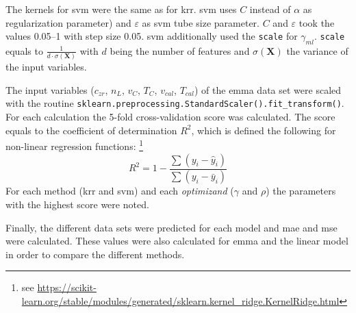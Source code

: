 The kernels for \gls{svm} were the same as for \gls{krr}. 
\Gls{svm} uses $C$ instead of $\alpha$ as regularization parameter) and  $\varepsilon$ as \gls{svm} tube size parameter.
$C$ and $\varepsilon$ took the values 0.05--1 with step size 0.05. 
\Gls{svm} additionally used the \texttt{scale} for $\gamma_{ml}$.
\texttt{scale} equals to $\frac{1}{d \cdot \sigma(\mathbf{X})}$ with $d$ being the number of features 
and $\sigma(\mathbf{X})$ the variance of the input variables. 

The input variables ($c_{zr}$, $n_L$, $v_{C}$, $T_{C}$, $v_{cal}$, $T_{cal}$) 
of the \gls{emma} data set were scaled with the routine \texttt{sklearn.preprocessing.StandardScaler().fit\_transform()}. %
For each calculation the 5-fold cross-validation score was calculated. 
The score equals to the coefficient of determination $R^2$, which is defined the following for non-linear regression functions:
\footnote{see \href{https://scikit-learn.org/stable/modules/generated/sklearn.kernel\_ridge.KernelRidge.html}{https://scikit-learn.org/stable/modules/generated/sklearn.kernel\_ridge.KernelRidge.html}}
\begin{equation}
	\label{eq:r2}
	R^2 = 1-\frac{\sum (y_i - \hat{y}_i)}{\sum (y_i - \bar{y}_i)}
\end{equation}
For each method (\gls{krr} and \gls{svm}) and each \textit{optimizand} ($\gamma$ and $\rho$) 
the parameters with the highest score were noted.
 
Finally, the different data sets were predicted for each model and \gls{mae} and \gls{mse} were calculated.
These values were also calculated for \gls{emma} and the linear model in order to compare the different methods. 
